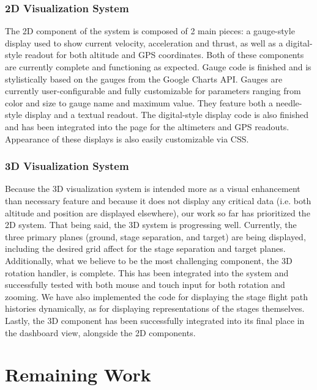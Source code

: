 \documentclass[journal,10pt,onecolumn,compsoc]{IEEEtran}
\begin{document}
		\subsubsection{2D Visualization System}
			The 2D component of the system is composed of 2 main pieces: a gauge-style display used to show current velocity, acceleration and thrust, as well as a digital-style readout for both altitude and GPS coordinates.
			Both of these components are currently complete and functioning as expected.
			Gauge code is finished and is stylistically based on the gauges from the Google Charts API.
			Gauges are currently user-configurable and fully customizable for parameters ranging from color and size to gauge name and maximum value.
			They feature both a needle-style display and a textual readout.
			The digital-style display code is also finished and has been integrated into the page for the altimeters and GPS readouts. 
			Appearance of these displays is also easily customizable via CSS.
			
		\subsubsection{3D Visualization System}
			Because the 3D visualization system is intended more as a visual enhancement than necessary feature and because it does not display any critical data (i.e. both altitude and position are displayed elsewhere), our work so far has prioritized the 2D system.
			That being said, the 3D system is progressing well.
			Currently, the three primary planes (ground, stage separation, and target) are being displayed, including the desired grid affect for the stage separation and target planes.
			Additionally, what we believe to be the most challenging component, the 3D rotation handler, is complete.
			This has been integrated into the system and successfully tested with both mouse and touch input for both rotation and zooming.
			We have also implemented the code for displaying the stage flight path histories dynamically, as for displaying representations of the stages themselves.
			Lastly, the 3D component has been successfully integrated into its final place in the dashboard view, alongside the 2D components.	
\newpage


\section{Remaining Work}
\end{document}
